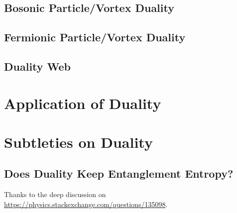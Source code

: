 \documentclass[10pt,nofootinbib]{revtex4}
\numberwithin{equation}{section}
\begin{document}
	\subsection{Bosonic Particle/Vortex Duality}
	\subsection{Fermionic Particle/Vortex Duality}
	\subsection{Duality Web}

\section{Application of Duality}

\section{Subtleties on Duality}
	\subsection{Does Duality Keep Entanglement Entropy?}
		Thanks to the deep discussion on \url{https://physics.stackexchange.com/questions/135098}.


\end{document}
